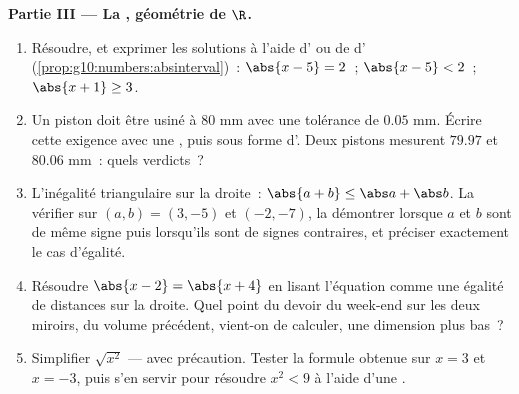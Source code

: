 \begin{problem}
\medskip
\noindent\textbf{Partie III --- La , géométrie de
$\R$.}
\begin{enumerate}[resume]
  \item Résoudre, et exprimer les solutions à l'aide d' ou
        de  d'
        (\cref{prop:g10:numbers:absinterval})~:
        $\abs{x - 5} = 2$~; \quad $\abs{x - 5} < 2$~; \quad
        $\abs{x + 1} \geq 3$.
  \item Un piston doit être usiné à $80$ mm avec une tolérance de
        $0.05$ mm. Écrire cette exigence avec une ,
        puis sous forme d'. Deux pistons mesurent $79.97$
        et $80.06$ mm~: quels verdicts~?
  \item L'inégalité triangulaire sur la droite~:
        $\abs{a + b} \leq \abs a + \abs b$. La vérifier sur
        $(a, b) = (3, -5)$ et $(-2, -7)$, la démontrer lorsque $a$ et
        $b$ sont de même signe puis lorsqu'ils sont de signes
        contraires, et préciser exactement le cas d'égalité.
  \item Résoudre $\abs{x - 2} = \abs{x + 4}$ en lisant l'équation
        comme une égalité de distances sur la droite. Quel point du
        devoir du week-end sur les deux miroirs, du volume précédent,
        vient-on de calculer, une dimension plus bas~?
  \item Simplifier $\sqrt{x^2}$ --- avec précaution. Tester la
        formule obtenue sur $x = 3$ et $x = -3$, puis s'en servir
        pour résoudre $x^2 < 9$ à l'aide d'une .
\end{enumerate}


\end{problem}
